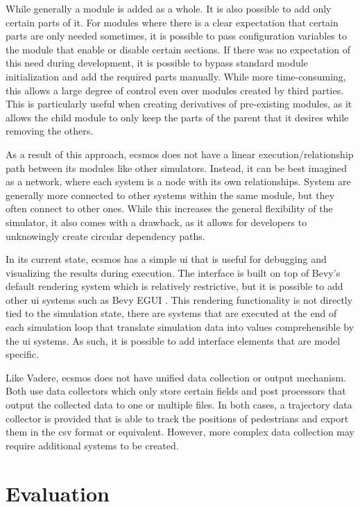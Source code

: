 \documentclass[twoside, 11pt]{article}
\begin{document}
While generally a module is added as a whole. It is also possible to add only certain parts of it. For modules where there is a clear expectation that certain parts are only needed sometimes, it is possible to pass configuration variables to the module that enable or disable certain sections. If there was no expectation of this need during development, it is possible to bypass standard module initialization and add the required parts manually. While more time-consuming, this allows a large degree of control even over modules created by third parties. This is particularly useful when creating derivatives of pre-existing modules, as it allows the child module to only keep the parts of the parent that it desires while removing the others.

As a result of this approach, \gls{ecsmos} does not have a linear execution/relationship path between its modules like other simulators. Instead, it can be best imagined as a network, where each system is a node with its own relationships. System are generally more connected to other systems within the same module, but they often connect to other ones. While this increases the general flexibility of the simulator, it also comes with a drawback, as it allows for developers to unknowingly create circular dependency paths.

In its current state, \gls{ecsmos} has a simple \gls{ui} that is useful for debugging and visualizing the results during execution. The interface is built on top of Bevy's default rendering system which is relatively restrictive, but it is possible to add other \gls{ui} systems such as Bevy EGUI \cite{bevyegui}. This rendering functionality is not directly tied to the simulation state, there are systems that are executed at the end of each simulation loop that translate simulation data into values comprehensible by the \gls{ui} systems. As such, it is possible to add interface elements that are model specific. 

Like Vadere, \gls{ecsmos} does not have unified data collection or output mechanism. Both use data collectors which only store certain fields and post processors that output the collected data to one or multiple files. In both cases, a trajectory data collector is provided that is able to track the positions of pedestrians and export them in the \gls{csv} format or equivalent. However, more complex data collection may require additional systems to be created.

\section{Evaluation}
\end{document}
